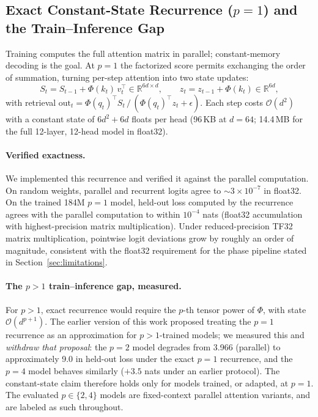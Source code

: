 \documentclass{article}
\newcommand{\R}{\mathbb{R}}
\newcommand{\cO}{\mathcal{O}}
\begin{document}
\subsection{Exact Constant-State Recurrence ($p=1$) and the Train--Inference Gap}
\label{sec:recurrent}

Training computes the full attention matrix in parallel; constant-memory decoding is the goal. At $p=1$ the factorized score permits exchanging the order of summation, turning per-step attention into two state updates:
\begin{equation}
S_t = S_{t-1} + \Phi(k_t)\, v_t^\top \in \R^{6d \times d}, \qquad z_t = z_{t-1} + \Phi(k_t) \in \R^{6d},
\end{equation}
with retrieval $\text{out}_t = \Phi(q_t)^\top S_t \,/\, (\Phi(q_t)^\top z_t + \epsilon)$. Each step costs $\cO(d^2)$ with a constant state of $6d^2 + 6d$ floats per head (96\,KB at $d=64$; 14.4\,MB for the full 12-layer, 12-head model in float32).

\paragraph{Verified exactness.} We implemented this recurrence and verified it against the parallel computation. On random weights, parallel and recurrent logits agree to $\sim 3\times 10^{-7}$ in float32. On the trained 184M $p=1$ model, held-out loss computed by the recurrence agrees with the parallel computation to within $10^{-4}$ nats (float32 accumulation with highest-precision matrix multiplication). Under reduced-precision TF32 matrix multiplication, pointwise logit deviations grow by roughly an order of magnitude, consistent with the float32 requirement for the phase pipeline stated in Section~\ref{sec:limitations}.

\paragraph{The $p>1$ train--inference gap, measured.} For $p > 1$, exact recurrence would require the $p$-th tensor power of $\Phi$, with state $\cO(d^{p+1})$. The earlier version of this work proposed treating the $p=1$ recurrence as an approximation for $p>1$-trained models; we measured this and \emph{withdraw that proposal}: the $p=2$ model degrades from 3.966 (parallel) to approximately 9.0 in held-out loss under the exact $p=1$ recurrence, and the $p=4$ model behaves similarly ($+3.5$ nats under an earlier protocol). The constant-state claim therefore holds only for models trained, or adapted, at $p=1$. The evaluated $p \in \{2,4\}$ models are fixed-context parallel attention variants, and are labeled as such throughout.
\end{document}
